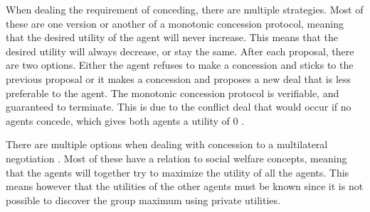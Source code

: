 \begin{figure}
\end{figure}
When dealing the requirement of conceding, there are multiple strategies. Most of these are one version or another of a monotonic concession protocol, meaning that the desired utility of the agent will never increase. This means that the desired utility will always decrease, or stay the same. After each proposal, there are two options. Either the agent refuses to make a concession and sticks to the previous proposal or it makes a concession and proposes a new deal that is less preferable to the agent. The monotonic concession protocol is verifiable, and guaranteed to terminate. This is due to the conflict deal that would occur if no agents concede, which gives both agents a utility of 0 \citep{endriss2006monotonic}.


There are multiple options when dealing with concession to a multilateral negotiation \citep{endriss2006monotonic}. Most of these have a relation to social welfare concepts, meaning that the agents will together try to maximize the utility of all the agents. This means however that the utilities of the other agents must be known since it is not possible to discover the group maximum using private utilities.

